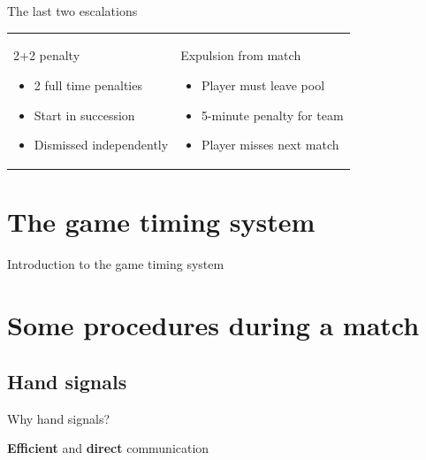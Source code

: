 \documentclass{beamer}
\begin{document}
    \begin{frame}{The last two escalations}
        \begin{tabular}{ll}
            \parbox{0.5\textwidth}
            {
                \begin{center}
                    2+2 penalty
                \end{center}
                \begin{itemize}
                    \item 2 full time penalties
                    \item Start in succession
                    \item Dismissed independently
                \end{itemize}
            }
            &
            \parbox{0.5\textwidth}
            {
                \begin{center}
                    Expulsion from match
                \end{center}
                \begin{itemize}
                    \item Player must leave pool
                    \item 5-minute penalty for team
                    \item Player misses next match
                \end{itemize}
            }
        \end{tabular}
    \end{frame}

    \section{The game timing system}
    \begin{frame}
        \begin{center}
            Introduction to the game timing system
        \end{center}
    \end{frame}

    \section{Some procedures during a match}
    \subsection{Hand signals}

    \begin{frame}{Why hand signals?}
        \begin{center}
            \pause

            \textbf{Efficient} and \textbf{direct} communication
        \end{center}
    \end{frame}
\end{document}
